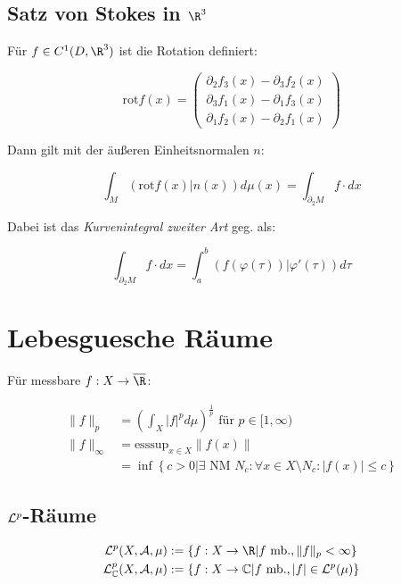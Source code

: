 \subsection*{Satz von Stokes in $\R^3$}

Für $f \in C^1(D,\R^3)$ ist die Rotation definiert:

$$\text{rot} f(x) = \begin{pmatrix}
	\partial_2 f_3(x) - \partial_3 f_2(x) \\
	\partial_3 f_1(x) - \partial_1 f_3(x) \\
	\partial_1 f_2(x) - \partial_2 f_1(x)
\end{pmatrix}$$

Dann gilt mit der äußeren Einheitsnormalen $n$:

$$\int_M (\text{rot} f(x) | n(x)) d\mu(x) = \int_{\partial_2 M} f \cdot dx$$

Dabei ist das \emph{Kurvenintegral zweiter Art} geg. als:

$$\int_{\partial_2 M} f \cdot dx = \int_a^b (f(\varphi(\tau))|\varphi'(\tau)) d\tau$$

\section*{Lebesguesche Räume}

Für messbare $f : X \to \overline\R$:

\vspace{-4mm}
\begin{align*}
\|f\|_p &= \left(\int_X |f|^p d\mu\right)^\frac{1}{p} \text{ für } p \in [1,\infty)\\
\|f\|_\infty &= \text{esssup}_{x \in X} \|f(x)\|\\
      &= \inf\left\{ c > 0 | \exists \text{ NM } N_c : \forall x \in X \setminus N_c : |f(x)| \leq c\right\}
\end{align*}

\subsection*{$\mathcal{L}^p$-Räume}

\vspace{-4mm}
\begin{align*}
\L^p(X,\A,\mu) &:= \{ f : X \to \R | f \text{ mb.}, \|f\|_p < \infty\} \\
\L_\mathbb{C}^p(X,\A,\mu) &:= \{ f : X \to \mathbb{C} | f \text{ mb.}, |f| \in \L^p(\mu) \}
\end{align*}

